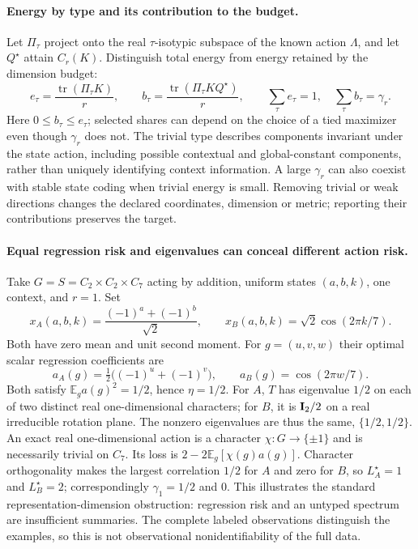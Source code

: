 \paragraph{Energy by type and its contribution to the budget.}
\label{sp:type-energy}
Let $\Pi_\tau$ project onto the real $\tau$-isotypic subspace of the known action $\Lambda$, and let $Q^\star$ attain $C_r(K)$. Distinguish total energy from energy retained by the dimension budget:
\[
 e_\tau=\frac{\operatorname{tr}(\Pi_\tau K)}r,\qquad
 b_\tau=\frac{\operatorname{tr}(\Pi_\tau KQ^\star)}r,\qquad
 \sum_\tau e_\tau=1,\quad\sum_\tau b_\tau=\gamma_r.
\]
Here $0\le b_\tau\le e_\tau$; selected shares can depend on the choice of a tied maximizer even though $\gamma_r$ does not. The trivial type describes components invariant under the state action, including possible contextual and global-constant components, rather than uniquely identifying context information. A large $\gamma_r$ can also coexist with stable state coding when trivial energy is small. Removing trivial or weak directions changes the declared coordinates, dimension or metric; reporting their contributions preserves the target.

\paragraph{Equal regression risk and eigenvalues can conceal different action risk.}
\label{sp:counterexample}
Take $G=S=C_2\times C_2\times C_7$ acting by addition, uniform states $(a,b,k)$, one context, and $r=1$. Set
\[
 x_A(a,b,k)=\frac{(-1)^a+(-1)^b}{\sqrt2},\qquad
 x_B(a,b,k)=\sqrt2\cos(2\pi k/7).
\]
Both have zero mean and unit second moment. For $g=(u,v,w)$ their optimal scalar regression coefficients are
\[
 a_A(g)=\tfrac12\big((-1)^u+(-1)^v\big),\qquad
 a_B(g)=\cos(2\pi w/7).
\]
Both satisfy $\mathbb E_g a(g)^2=1/2$, hence $\eta=1/2$. For $A$, $T$ has eigenvalue $1/2$ on each of two distinct real one-dimensional characters; for $B$, it is $\mathbf{I}_2/2$ on a real irreducible rotation plane. The nonzero eigenvalues are thus the same, $\{1/2,1/2\}$. An exact real one-dimensional action is a character $\chi:G\to\{\pm1\}$ and is necessarily trivial on $C_7$. Its loss is $2-2\mathbb E_g[\chi(g)a(g)]$. Character orthogonality makes the largest correlation $1/2$ for $A$ and zero for $B$, so $L_A^\star=1$ and $L_B^\star=2$; correspondingly $\gamma_1=1/2$ and $0$. This illustrates the standard representation-dimension obstruction: regression risk and an untyped spectrum are insufficient summaries. The complete labeled observations distinguish the examples, so this is not observational nonidentifiability of the full data.

